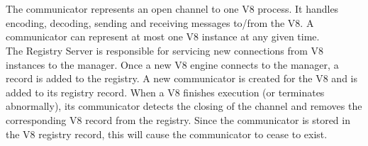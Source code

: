 \documentclass{l4proj}
\begin{document}
\\\\
\hspace*{3em} The communicator represents an open channel to one V8 process. It handles encoding, decoding, sending and receiving messages to/from the V8. A communicator can represent at most one V8 instance at any given time.\\
\hspace*{3em} The Registry Server is responsible for servicing new connections from V8 instances to the manager. Once a new V8 engine connects to the manager, a record is added to the registry. A new communicator is created for the V8 and is added to its registry record. When a V8 finishes execution (or terminates abnormally), its communicator detects the closing of the channel and removes the corresponding V8 record from the registry. Since the communicator is stored in the V8 registry record, this will cause the communicator to cease to exist. 
\end{document}
